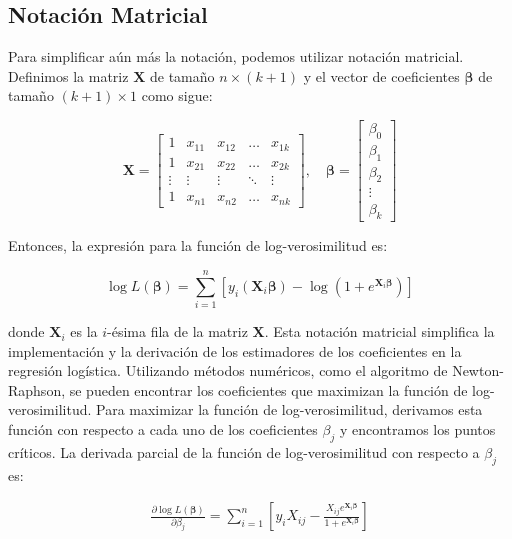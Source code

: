 \documentclass[a4paper]{report} %
\begin{document}
\subsection{Notaci\'on Matricial}

Para simplificar aún más la notación, podemos utilizar notación matricial. Definimos la matriz $\mathbf{X}$ de tamaño $n \times (k+1)$ y el vector de coeficientes $\boldsymbol{\beta}$ de tamaño $(k+1) \times 1$ como sigue:

\begin{equation}\label{Eq.Matricial1}
\mathbf{X} = \begin{bmatrix}
1 & x_{11} & x_{12} & \ldots & x_{1k} \\
1 & x_{21} & x_{22} & \ldots & x_{2k} \\
\vdots & \vdots & \vdots & \ddots & \vdots \\
1 & x_{n1} & x_{n2} & \ldots & x_{nk}
\end{bmatrix}, \quad
\boldsymbol{\beta} = \begin{bmatrix}
\beta_0 \\
\beta_1 \\
\beta_2 \\
\vdots \\
\beta_k
\end{bmatrix}
\end{equation}

Entonces, la expresión para la función de log-verosimilitud es:

\begin{equation}\label{Eq.LogLikelihood1}
\log L(\boldsymbol{\beta}) = \sum_{i=1}^{n} \left[ y_i (\mathbf{X}_i \boldsymbol{\beta}) - \log(1 + e^{\mathbf{X}_i \boldsymbol{\beta}}) \right]
\end{equation}

donde $\mathbf{X}_i$ es la $i$-ésima fila de la matriz $\mathbf{X}$.  Esta notación matricial simplifica la implementación y la derivación de los estimadores de los coeficientes en la regresión logística. Utilizando métodos numéricos, como el algoritmo de Newton-Raphson, se pueden encontrar los coeficientes que maximizan la función de log-verosimilitud. Para maximizar la función de log-verosimilitud, derivamos esta función con respecto a cada uno de los coeficientes $\beta_j$ y encontramos los puntos críticos. La derivada parcial de la función de log-verosimilitud con respecto a $\beta_j$ es:

\begin{eqnarray}\label{Eq.1.14}
\frac{\partial \log L(\boldsymbol{\beta})}{\partial \beta_j} = \sum_{i=1}^{n} \left[ y_i X_{ij} - \frac{X_{ij} e^{\mathbf{X}_i \boldsymbol{\beta}}}{1 + e^{\mathbf{X}_i \boldsymbol{\beta}}} \right]
\end{eqnarray}
\end{document}
